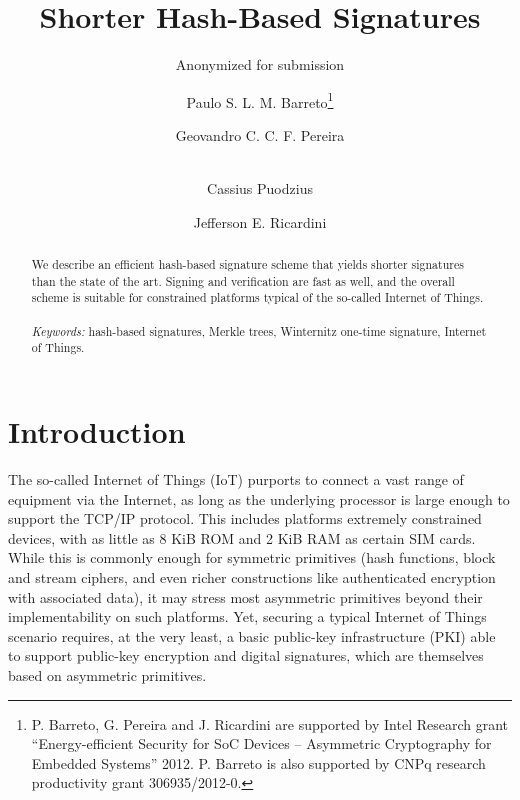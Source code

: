 \documentclass[11pt]{llncs}
\begin{document}
\pagestyle{plain}

\title{Shorter Hash-Based Signatures}

{ %
\author{
Anonymized for submission
}
\institute{
}
} %
{ %
\author{
Paulo S. L. M. Barreto\thanks{
P. Barreto, G. Pereira and J. Ricardini are supported by Intel Research grant ``Energy-efficient Security for SoC Devices -- Asymmetric Cryptography for Embedded Systems'' 2012.
P. Barreto is also supported by CNPq research productivity grant 306935/2012-0.
}
\and
Geovandro C. C. F. Pereira
\and\\
Cassius Puodzius
\and
Jefferson E. Ricardini
}
} %

\maketitle

\begin{abstract}
We describe an efficient hash-based signature scheme that yields shorter signatures than the state of the art. Signing and verification are fast as well, and the overall scheme is suitable for constrained platforms typical of the so-called Internet of Things.\\
\\
\emph{Keywords:} hash-based signatures, Merkle trees, Winternitz one-time signature, Internet of Things.
\end{abstract}

\section{Introduction}

The so-called Internet of Things (IoT) purports to connect a vast range of equipment via the Internet, as long as the underlying processor is large enough to support the TCP/IP protocol. This includes platforms extremely constrained devices, with as little as 8 KiB ROM and 2 KiB RAM as certain SIM cards. While this is commonly enough for symmetric primitives (hash functions, block and stream ciphers, and even richer constructions like authenticated encryption with associated data), it may stress most asymmetric primitives beyond their implementability on such platforms. Yet, securing a typical Internet of Things scenario requires, at the very least, a basic public-key infrastructure (PKI) able to support public-key encryption and digital signatures, which are themselves based on asymmetric primitives.
\end{document}
